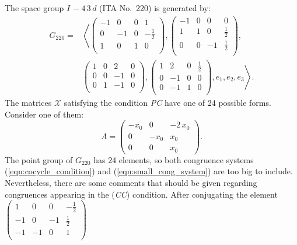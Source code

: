 The space group $I\,-4\,3\,d$ (ITA No.~220) is generated by:
\begin{align*}
G_{220} =& \left\langle\left(\begin{array}{rrr|r}
-1 & 0 & 0 & 1 \\
0 & -1 & 0 & -\frac{1}{2} \\
1 & 0 & 1 & 0 \\
\end{array}\right) , \left(\begin{array}{rrr|r}
-1 & 0 & 0 & 0 \\
1 & 1 & 0 & \frac{1}{2} \\
0 & 0 & -1 & \frac{1}{2} \\
\end{array}\right) , \right. \\
& \left. \left(\begin{array}{rrr|r}
1 & 0 & 2 & 0 \\
0 & 0 & -1 & 0 \\
0 & 1 & -1 & 0 \\
\end{array}\right) , \left(\begin{array}{rrr|r}
1 & 2 & 0 & \frac{1}{2} \\
0 & -1 & 0 & 0 \\
0 & -1 & 1 & 0 \\
\end{array}\right) , e_1 , e_2 , e_3\right\rangle.
\end{align*}
The matrices $\mathcal{X}$ satisfying the condition \textit{PC} have one of 24 possible forms. Consider one
of them:
$$A= \left(\begin{array}{rrr}
-x_{0} & 0 & -2 \, x_{0} \\
0 & -x_{0} & x_{0} \\
0 & 0 & x_{0}
\end{array}\right).
$$
The point group of $G_{220}$ has 24 elements, so both congruence systems (\ref{eqn:cocycle_condition}) and (\ref{eqn:small_cong_system})
are too big to include. Nevertheless, there are some comments that should be given regarding congruences appearing in
the (\textit{CC}) condition. After conjugating the element
$\left(\begin{array}{rrr|r}
1 & 0 & 0 & -\frac{1}{2} \\
-1 & 0 & -1 & \frac{1}{2} \\
-1 & -1 & 0 & 1 \\
\end{array}\right)$
